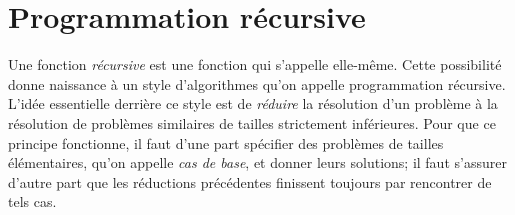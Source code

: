 \documentclass{magnoliaold}
\begin{document}











\section{Programmation récursive}

Une fonction \emph{récursive} est une fonction qui s'appelle elle-même. Cette
possibilité donne naissance à un style d'algorithmes qu'on appelle programmation
récursive. L'idée essentielle derrière ce style est de \emph{réduire} la résolution
d'un problème à la résolution de problèmes similaires de tailles strictement inférieures.
Pour que ce principe fonctionne, il faut d'une part spécifier des problèmes de tailles
élémentaires, qu'on appelle \emph{cas de base}, et donner leurs solutions; il faut s'assurer
d'autre part que les réductions précédentes finissent toujours par rencontrer de
tels cas.
\end{document}
